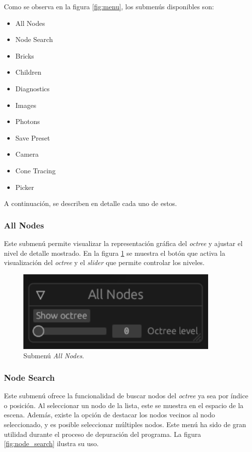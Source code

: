 Como se observa en la figura \ref{fig:menu}, los submenús disponibles son:

\begin{itemize}
	\item All Nodes
	\item Node Search
	\item Bricks
	\item Children
	\item Diagnostics
	\item Images
	\item Photons
	\item Save Preset
	\item Camera
	\item Cone Tracing
	\item Picker
\end{itemize}

A continuación, se describen en detalle cada uno de estos.

\subsubsection{All Nodes}

Este submenú permite visualizar la representación gráfica del \textit{octree} y ajustar el nivel de detalle mostrado. En la figura \ref{fig:all_nodes} se muestra el botón que activa la visualización del \textit{octree} y el \textit{slider} que permite controlar los niveles.

\begin{figure}[h]
    \centering
    \includegraphics[width=.5\textwidth]{all_nodes.png}
    \caption{Submenú \textit{All Nodes}.}
    \label{fig:all_nodes}
\end{figure}

\subsubsection{Node Search}

Este submenú ofrece la funcionalidad de buscar nodos del \textit{octree} ya sea por índice o posición. Al seleccionar un nodo de la lista, este se muestra en el espacio de la escena. Además, existe la opción de destacar los nodos vecinos al nodo seleccionado, y es posible seleccionar múltiples nodos. Este menú ha sido de gran utilidad durante el proceso de depuración del programa. La figura \ref{fig:node_search} ilustra su uso.

